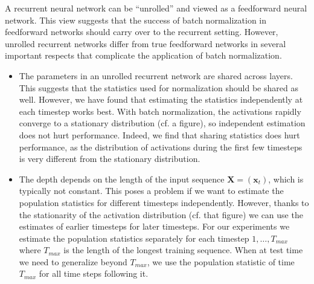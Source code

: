 \documentclass{article} %
\newcommand{\vect}[1]{\mathbf{#1}}
\newcommand{\mat}[1]{\mathbf{#1}}
\begin{document}
A recurrent neural network can be ``unrolled'' and viewed as a feedforward neural network.
This view suggests that the success of batch normalization in feedforward networks should carry over to the recurrent setting.
However, unrolled recurrent networks differ from true feedforward networks in several important respects that complicate the application of batch normalization.

\begin{itemize}
\item
The parameters in an unrolled recurrent network are shared across layers.
This suggests that the statistics used for normalization should be shared as well.
However, we have found that estimating the statistics independently at each timestep works best.
With batch normalization, the activations rapidly converge to a stationary distribution (cf. a figure), so independent estimation does not hurt performance.
Indeed, we find that sharing statistics does hurt performance, as the distribution of activations during the first few timesteps is very different from the stationary distribution.
\\ \item
The depth depends on the length of the input sequence $\mat{X} = (\vect{x}_t)$, which is typically not constant.
This poses a problem if we want to estimate the population statistics for different timesteps independently.
However, thanks to the stationarity of the activation distribution (cf. that figure) we can use the estimates of earlier timesteps for later timesteps.
For our experiments we estimate the population statistics separately for each timestep $1, \ldots, T_{max}$ where $T_{max}$ is the length of the longest training sequence.
When at test time we need to generalize beyond $T_{max}$, we use the population statistic of time $T_{max}$ for all time steps following it.


\end{itemize}
\end{document}
